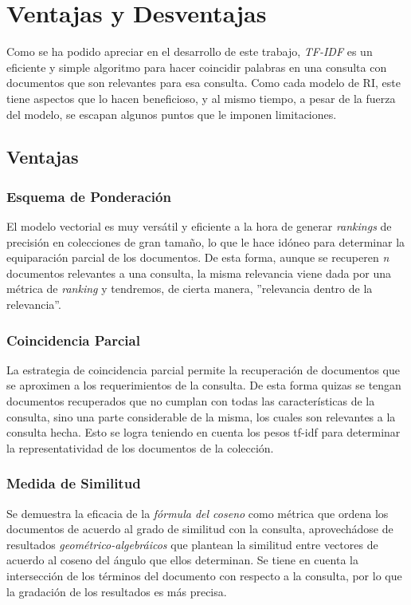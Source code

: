\section{Ventajas y Desventajas}

Como se ha podido apreciar en el desarrollo de este trabajo, \emph{TF-IDF} es
un eficiente y simple algoritmo para hacer coincidir palabras en una consulta
con documentos que son relevantes para esa consulta. Como cada
modelo de RI, este tiene aspectos que lo hacen beneficioso, y al mismo tiempo,
a pesar de la fuerza del modelo, se escapan algunos puntos que le imponen
limitaciones.\cite{ramos, aparicio, mishra}

\subsection{Ventajas}

\subsubsection{Esquema de Ponderación}

El modelo vectorial es muy versátil y eficiente a la hora de generar
\emph{rankings} de precisión en colecciones de gran tamaño, lo que le hace
idóneo para determinar la equiparación parcial de los documentos. De esta
forma, aunque se recuperen \emph{n} documentos relevantes a una consulta, la
misma relevancia viene dada por una métrica de \emph{ranking} y tendremos, de
cierta manera, ''relevancia dentro de la relevancia''.

\subsubsection{Coincidencia Parcial}

La estrategia de coincidencia parcial permite la recuperación de documentos
que se aproximen a los requerimientos de la consulta. De esta forma quizas se
tengan documentos recuperados que no cumplan con todas las características de
la consulta, sino una parte considerable de la misma, los cuales son relevantes
a la consulta hecha. Esto se logra teniendo en cuenta los pesos tf-idf para
determinar la representatividad de los documentos de la colección.

\subsubsection{Medida de Similitud}

Se demuestra la eficacia de la \emph{fórmula del coseno} como métrica que
ordena los documentos de acuerdo al grado de similitud con la consulta,
aprovechádose de resultados \emph{geométrico-algebráicos} que plantean la
similitud entre vectores de acuerdo al coseno del ángulo que ellos determinan.
Se tiene en cuenta la intersección de los términos del documento con respecto
a la consulta, por lo que la gradación de los resultados es más precisa.


